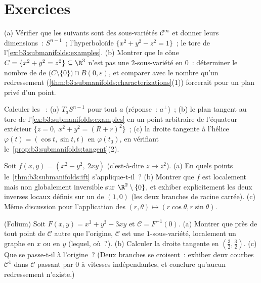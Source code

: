 \section{Exercices}

\begin{exercise}[$\star$]\label{exo:b3:submanifolds:1}
(a) Vérifier que les suivants sont des sous-variétés
$\mathcal C^\infty$ et donner leurs dimensions~: $S^{n-1}$~;
l'hyperboloïde $\{x^2 + y^2 - z^2 = 1\}$~; le tore de
l'\cref{ex:b3:submanifolds:examples}.
(b) Montrer que le cône $C = \{x^2 + y^2 = z^2\} \subseteq
\R^3$ n'est pas une $2$-sous-variété en $0$~: déterminer le
nombre de  de
$\bigl(C\setminus\{0\}\bigr)\cap B(0,\varepsilon)$, et
comparer avec le nombre qu'un redressement
(\cref{thm:b3:submanifolds:characterizations}(1)) forcerait
pour un plan privé d'un point.
\end{exercise}

\begin{exercise}[$\star$]\label{exo:b3:submanifolds:2}
Calculer les ~:
(a) $T_aS^{n-1}$ pour tout $a$ (réponse~: $a^\perp$)~;
(b) le plan tangent au tore de
l'\cref{ex:b3:submanifolds:examples} en un point arbitraire
de l'équateur extérieur $\{z = 0,\ x^2 + y^2 = (R + r)^2\}$~;
(c) la droite tangente à l'hélice $\varphi(t) = (\cos t,
\sin t, t)$ en $\varphi(t_0)$, en vérifiant
le~\cref{prop:b3:submanifolds:tangent}(2).
\end{exercise}

\begin{exercise}[$\star\star$]\label{exo:b3:submanifolds:3}
Soit $f(x, y) = (x^2 - y^2,\ 2xy)$ (c'est-à-dire $z \mapsto
z^2$).
(a) En quels points le~\cref{thm:b3:submanifolds:ift}
s'applique-t-il~?
(b) Montrer que $f$ est localement mais non globalement
inversible sur $\R^2\setminus\{0\}$, et exhiber explicitement
les deux inverses locaux définis sur un  de $(1, 0)$
(les deux branches de racine carrée).
(c) Même discussion pour l'application des  $(r, \theta) \mapsto (r\cos\theta, r\sin\theta)$.
\end{exercise}

\begin{exercise}[$\star\star$]\label{exo:b3:submanifolds:4}
(Folium) Soit $F(x,y) = x^3 + y^3 - 3xy$ et $\mathcal C =
F^{-1}(0)$.
(a) Montrer que près de tout point de $\mathcal C$ autre que
l'origine, $\mathcal C$ est une $1$-sous-variété, localement
un graphe en $x$ ou en $y$ (lequel, où~?).
(b) Calculer la droite tangente en $(\frac32, \frac32)$.
(c) Que se passe-t-il à l'origine~? (Deux branches se
croisent~: exhiber deux courbes $\mathcal C^1$ dans $\mathcal
C$ passant par $0$ à vitesses indépendantes, et conclure
qu'aucun redressement n'existe.)
\end{exercise}

